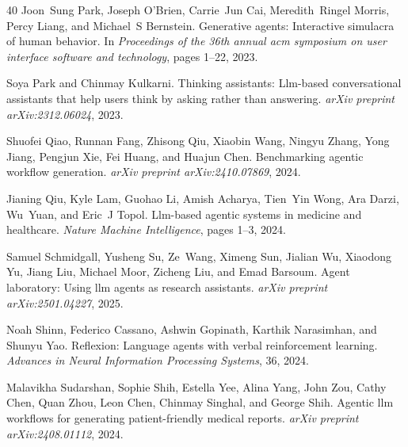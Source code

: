 \begin{thebibliography}{40}
Joon~Sung Park, Joseph O'Brien, Carrie~Jun Cai, Meredith~Ringel Morris, Percy Liang, and Michael~S Bernstein.
\newblock Generative agents: Interactive simulacra of human behavior.
\newblock In \emph{Proceedings of the 36th annual acm symposium on user interface software and technology}, pages 1--22, 2023.

Soya Park and Chinmay Kulkarni.
\newblock Thinking assistants: Llm-based conversational assistants that help users think by asking rather than answering.
\newblock \emph{arXiv preprint arXiv:2312.06024}, 2023.

Shuofei Qiao, Runnan Fang, Zhisong Qiu, Xiaobin Wang, Ningyu Zhang, Yong Jiang, Pengjun Xie, Fei Huang, and Huajun Chen.
\newblock Benchmarking agentic workflow generation.
\newblock \emph{arXiv preprint arXiv:2410.07869}, 2024.

Jianing Qiu, Kyle Lam, Guohao Li, Amish Acharya, Tien~Yin Wong, Ara Darzi, Wu~Yuan, and Eric~J Topol.
\newblock Llm-based agentic systems in medicine and healthcare.
\newblock \emph{Nature Machine Intelligence}, pages 1--3, 2024.

Samuel Schmidgall, Yusheng Su, Ze~Wang, Ximeng Sun, Jialian Wu, Xiaodong Yu, Jiang Liu, Michael Moor, Zicheng Liu, and Emad Barsoum.
\newblock Agent laboratory: Using llm agents as research assistants.
\newblock \emph{arXiv preprint arXiv:2501.04227}, 2025.

Noah Shinn, Federico Cassano, Ashwin Gopinath, Karthik Narasimhan, and Shunyu Yao.
\newblock Reflexion: Language agents with verbal reinforcement learning.
\newblock \emph{Advances in Neural Information Processing Systems}, 36, 2024.

Malavikha Sudarshan, Sophie Shih, Estella Yee, Alina Yang, John Zou, Cathy Chen, Quan Zhou, Leon Chen, Chinmay Singhal, and George Shih.
\newblock Agentic llm workflows for generating patient-friendly medical reports.
\newblock \emph{arXiv preprint arXiv:2408.01112}, 2024.


\end{thebibliography}
